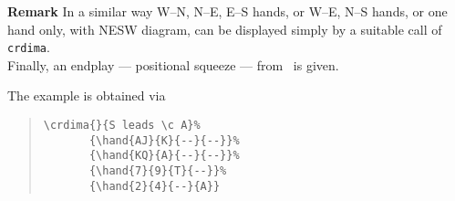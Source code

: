 {\bf Remark} In a similar way W--N, N--E, E--S hands,
or W--E, N--S hands, or one hand only, with NESW diagram,
can be displayed simply by a suitable call of \verb=crdima=. \\[2ex]
%
Finally, an endplay --- positional squeeze ---
from \cite{HWK}\ is given.
\begin{quote}
%
       {}%
       {}%
       {}%
       {}
\end{quote}
The example is obtained via
\begin{quote}
\begin{verbatim}
\crdima{}{S leads \c A}%
       {\hand{AJ}{K}{--}{--}}%
       {\hand{KQ}{A}{--}{--}}%
       {\hand{7}{9}{T}{--}}%
       {\hand{2}{4}{--}{A}}
\end{verbatim}
\end{quote}
%
